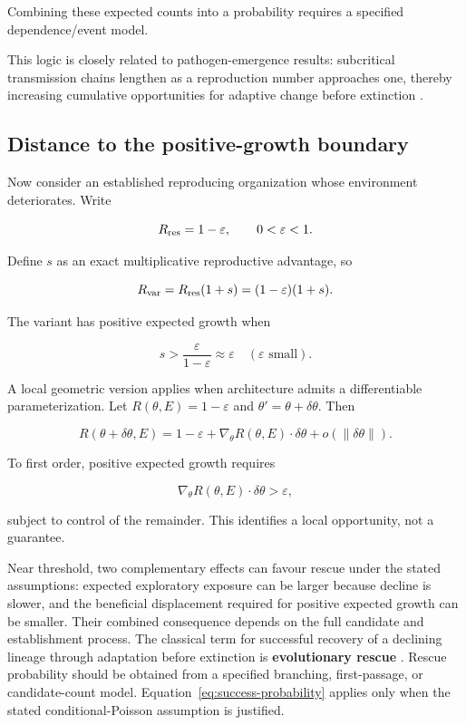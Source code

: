 \documentclass[11pt,a4paper]{article}
\begin{document}
Combining these expected counts into a probability requires a specified dependence/event model.

This logic is closely related to pathogen-emergence results: subcritical transmission chains lengthen as a reproduction number approaches one, thereby increasing cumulative opportunities for adaptive change before extinction \citep{Antia2003,Woolhouse2005}.

\subsection{Distance to the positive-growth boundary}

Now consider an established reproducing organization whose environment deteriorates. Write

\[
R_{\rm res}=1-\varepsilon,
\qquad0<\varepsilon<1.
\]

Define $s$ as an exact multiplicative reproductive advantage, so

\[
R_{\rm var}=R_{\rm res}(1+s)=(1-\varepsilon)(1+s).
\]

The variant has positive expected growth when

\begin{equation}
s>\frac{\varepsilon}{1-\varepsilon}\approx\varepsilon
\quad(\varepsilon\text{ small}).
\label{eq:rescue-step}
\end{equation}

A local geometric version applies when architecture admits a differentiable parameterization. Let $R(\theta,E)=1-\varepsilon$ and $\theta'=\theta+\delta\theta$. Then

\[
R(\theta+\delta\theta,E)
=
1-\varepsilon+\nabla_\theta R(\theta,E)\cdot\delta\theta+o(\|\delta\theta\|).
\]

To first order, positive expected growth requires

\begin{equation}
\nabla_\theta R(\theta,E)\cdot\delta\theta>\varepsilon,
\label{eq:gradient-rescue}
\end{equation}

subject to control of the remainder. This identifies a local opportunity, not a guarantee.

Near threshold, two complementary effects can favour rescue under the stated assumptions: expected exploratory exposure can be larger because decline is slower, and the beneficial displacement required for positive expected growth can be smaller. Their combined consequence depends on the full candidate and establishment process. The classical term for successful recovery of a declining lineage through adaptation before extinction is \textbf{evolutionary rescue} \citep{Bell2017}. Rescue probability should be obtained from a specified branching, first-passage, or candidate-count model. Equation~\eqref{eq:success-probability} applies only when the stated conditional-Poisson assumption is justified.
\end{document}
